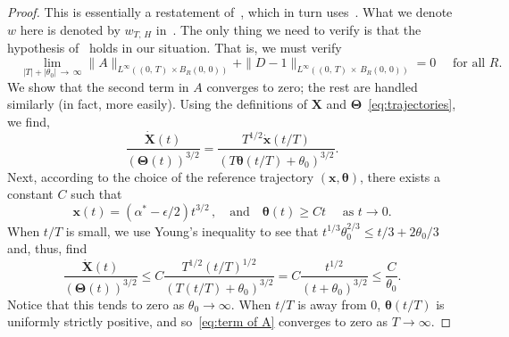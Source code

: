 \documentclass[AHL,Unicode,longabstracts]{cedram}
\newcommand{\bx}{\mathbf{x}}
\newcommand{\bX}{\mathbf{X}}
\newcommand{\btheta}{\boldsymbol{\theta}}
\newcommand{\bTheta}{\boldsymbol{\Theta}}
\newcommand{\1}{\mathds{1}}
\begin{document}
\begin{proof}
This is essentially a restatement of~\cite[p.~745]{BHR_acceleration}, which in turn uses~\cite[Lemmas~5.1, 5.2]{BHR_acceleration}. What we denote $w$ here is denoted by $w_{T,\,H}$ in~\cite{BHR_acceleration}. The only thing we need to verify is that the hypothesis of~\cite[Lemma~5.1]{BHR_acceleration} holds in our situation. That is, we must verify
\[
\quad \lim_{|T| + |\theta_0|\,\rightarrow\,\infty}\|A\|_{L^\infty\left((0,\,T)\,\times B_R(0,\,0)\right)}+\|D-1\|_{L^\infty\left((0,\,T)\,\times\,B_R(0,\,0)\right)} = 0 \quad \text{ for all }R.
\]
We show that the second term in $A$ converges to zero; the rest are handled similarly (in fact, more easily). Using the definitions of $\bX$ and $\bTheta$~\eqref{eq:trajectories}, we find,
\begin{equation}\label{eq:term of A}
\frac{\dot{\bX}(t)}{(\bTheta(t))^{3/2}} = \frac{T^{1/2}\dot{\bx}\left(t/T\right)}{\left(T\btheta\left(t/T\right) + \theta_0\right)^{3/2}}.
\end{equation}
Next, according to the choice of the reference trajectory $(\bx,\btheta)$, there exists a constant $C$ such that
\begin{equation}\label{eq:Theta near 0}
\bx(t) = (\alpha^* - \epsilon/2) t^{3/2}\,, \quad\text{and}\quad \btheta(t) \geq C t \quad \text{ as }t\to 0.
\end{equation}
When $t/T$ is small, we use Young's inequality to see that $t^{1/3} \theta_0^{2/3} \leq t/3 + 2 \theta_0/3$ and, thus, find
\[
\frac{\dot{\bX}(t)}{(\bTheta(t))^{3/2}} \leq C\frac{T^{1/2}\left(t/T\right)^{1/2}}{\left(T\left(t/T\right) + \theta_0\right)^{3/2}} = C\frac{t^{1/2}}{\left(t+\theta_0\right)^{3/2}} \leq \frac{C}{\theta_0}.
\]
Notice that this tends to zero as $\theta_0 \to \infty$. When $t/T$ is away from 0, $\btheta (t/T)$ is uniformly strictly positive, and so~\eqref{eq:term of A} converges to zero as $T\to \infty$.
\end{proof}
\end{document}
